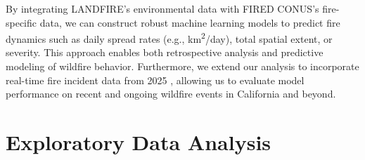 \documentclass{article}
\begin{document}
By integrating LANDFIRE’s environmental data with FIRED CONUS’s fire-specific data, we can construct robust machine learning models to predict fire dynamics such as daily spread rates (e.g., km\textsuperscript{2}/day), total spatial extent, or severity. This approach enables both retrospective analysis and predictive modeling of wildfire behavior. Furthermore, we extend our analysis to incorporate real-time fire incident data from 2025 \cite{calfire2025}, allowing us to evaluate model performance on recent and ongoing wildfire events in California and beyond.

\section{Exploratory Data Analysis}



\end{document}
